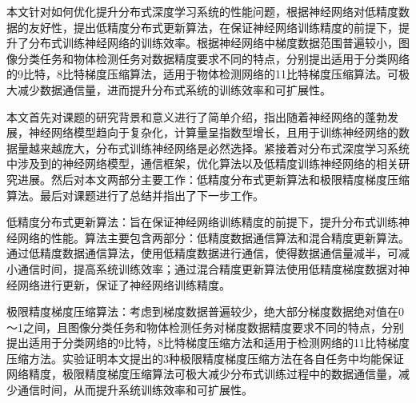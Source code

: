 

\begin{last_words}
  本文针对如何优化提升分布式深度学习系统的性能问题，根据神经网络对低精度数据的友好性，提出低精度分布式更新算法，在保证神经网络训练精度的前提下，提升了分布式训练神经网络的训练效率。根据神经网络中梯度数据范围普遍较小，图像分类任务和物体检测任务对数据精度要求不同的特点，分别提出适用于分类网络的9比特，8比特梯度压缩算法，适用于物体检测网络的11比特梯度压缩算法。可极大减少数据通信量，进而提升分布式系统的训练效率和可扩展性。

  本文首先对课题的研究背景和意义进行了简单介绍，指出随着神经网络的蓬勃发展，神经网络模型趋向于复杂化，计算量呈指数型增长，且用于训练神经网络的数据量越来越庞大，分布式训练神经网络是必然选择。紧接着对分布式深度学习系统中涉及到的神经网络模型，通信框架，优化算法以及低精度训练神经网络的相关研究进展。然后对本文两部分主要工作：低精度分布式更新算法和极限精度梯度压缩算法。最后对课题进行了总结并指出了下一步工作。

  低精度分布式更新算法：旨在保证神经网络训练精度的前提下，提升分布式训练神经网络的性能。算法主要包含两部分：低精度数据通信算法和混合精度更新算法。通过低精度数据通信算法，使用低精度数据进行通信，使得数据通信量减半，可减小通信时间，提高系统训练效率；通过混合精度更新算法使用低精度梯度数据对神经网络进行更新，保证了神经网络训练精度。

  极限精度梯度压缩算法：考虑到梯度数据普遍较少，绝大部分梯度数据绝对值在0～1之间，且图像分类任务和物体检测任务对梯度数据精度要求不同的特点，分别提出适用于分类网络的9比特，8比特梯度压缩方法和适用于检测网络的11比特梯度压缩方法。实验证明本文提出的3种极限精度梯度压缩方法在各自任务中均能保证网络精度，极限精度梯度压缩算法可极大减少分布式训练过程中的数据通信量，减少通信时间，从而提升系统训练效率和可扩展性。

\end{last_words}
